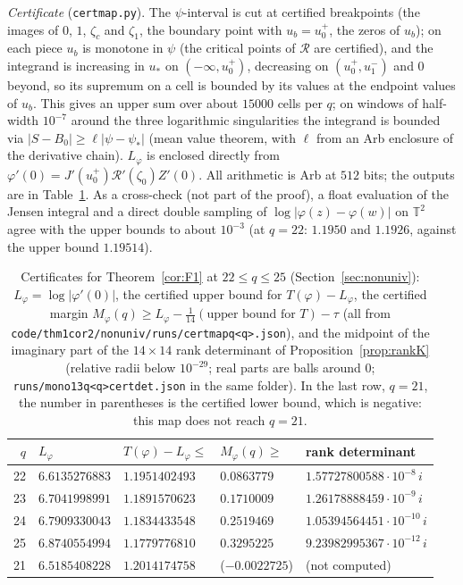 \documentclass[11pt]{amsart}
\theoremstyle{definition}
\theoremstyle{remark}
\numberwithin{equation}{section}
\newcommand{\TT}{\mathbb{T}}
\newcommand{\file}[1]{{\def\_{\textunderscore\allowbreak}\texttt{#1}}}
\begin{document}
\emph{Certificate} (\file{cert\_map.py}). The $\psi$-interval is cut at certified breakpoints (the images of $0$, $1$,
$\zeta_c$ and $\zeta_1$, the boundary point with $u_b=u_0^+$, the zeros of $u_b$); on each piece $u_b$ is monotone in
$\psi$ (the critical points of $\mathcal R$ are certified), and the integrand is increasing in $u_*$ on $(-\infty,u_0^+)$,
decreasing on $(u_0^+,u_1^-)$ and $0$ beyond, so its supremum on a cell is bounded by its values at the endpoint values of
$u_b$. This gives an upper sum over about $15000$ cells per $q$; on windows of half-width $10^{-7}$ around the three
logarithmic singularities the integrand is bounded via $|S-B_0|\ge\ell|\psi-\psi_*|$ (mean value theorem, with $\ell$ from
an Arb enclosure of the derivative chain). $L_\varphi$ is enclosed directly from $\varphi'(0)=J'(u_0^+)\mathcal R'(\zeta_0)Z'(0)$.
All arithmetic is Arb at $512$ bits; the outputs are in Table~\ref{tab:K}. As a cross-check (not part of the proof), a
float evaluation of the Jensen integral and a direct double sampling of $\log|\varphi(z)-\varphi(w)|$ on $\TT^2$ agree with
the upper bounds to about $10^{-3}$ (at $q=22$: $1.1950$ and $1.1926$, against the upper bound $1.19514$).

\begin{table}
\caption{Certificates for Theorem~\ref{cor:F1} at $22\le q\le25$ (Section~\ref{sec:nonuniv}): $L_\varphi=\log|\varphi'(0)|$,
the certified upper bound for $T(\varphi)-L_\varphi$, the certified margin $M_\varphi(q)\ge L_\varphi-\frac1{14}(\text{upper
bound for }T)-\tau$ (all from \file{code/thm1\_cor2/nonuniv/runs/cert\_map\_q<q>.json}), and the midpoint of the imaginary part of the $14\times14$
rank determinant of Proposition~\ref{prop:rankK} (relative radii below $10^{-29}$; real parts are balls around $0$; \file{runs/mono13\_q<q>\_cert\_det.json}
in the same folder). In the last row, $q=21$, the number in parentheses is the certified lower bound, which is negative:
this map does not reach $q=21$.}\label{tab:K}
\small
\begin{tabular}{rllll}
\toprule
$q$ & $L_\varphi$ & $T(\varphi)-L_\varphi\le$ & $M_\varphi(q)\ge$ & rank determinant\\
\midrule
22 & $6.6135276883$ & $1.1951402493$ & $0.0863779$ & $1.57727800588\cdot10^{-8}\,i$\\
23 & $6.7041998991$ & $1.1891570623$ & $0.1710009$ & $1.26178888459\cdot10^{-9}\,i$\\
24 & $6.7909330043$ & $1.1834433548$ & $0.2519469$ & $1.05394564451\cdot10^{-10}\,i$\\
25 & $6.8740554994$ & $1.1779776810$ & $0.3295225$ & $9.23982995367\cdot10^{-12}\,i$\\
\midrule
21 & $6.5185408228$ & $1.2014174758$ & ($-0.0022725$) & (not computed)\\
\bottomrule
\end{tabular}
\end{table}
\end{document}
